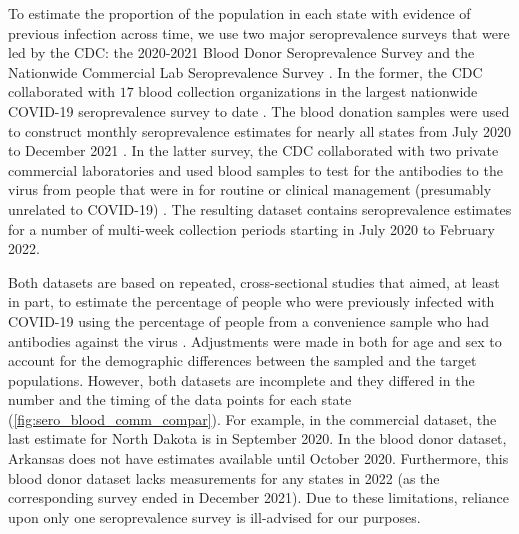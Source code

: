 \documentclass{article}
\begin{document}
To estimate the proportion of the population in each state with evidence of previous infection across time, we use two major seroprevalence surveys that were led by the CDC: the 2020-2021 Blood Donor Seroprevalence Survey and the Nationwide Commercial Lab Seroprevalence Survey \citep{cdc2021blood, cdc2021comm}. In the former, the CDC collaborated with $17$ blood collection organizations in the largest nationwide COVID-19 seroprevalence survey to date \citep{cdc2021blood}. The blood donation samples were used to construct monthly seroprevalence estimates for nearly all states from July 2020 to December 2021 \citep{jones2021estimated}. In the latter survey, the CDC collaborated with two private commercial laboratories and used blood samples to test for the antibodies to the virus from people that were in for routine or clinical management (presumably unrelated to COVID-19) \citep{bajema2021estimated}. The resulting dataset contains seroprevalence estimates for a number of multi-week collection periods starting in July 2020 to February 2022. 

Both datasets are based on repeated, cross-sectional studies that aimed, at least in part, to estimate the percentage of people who were previously infected with COVID-19 using the percentage of people from a convenience sample who had antibodies against the virus \citep{bajema2021estimated, cdc2020data, jones2021estimated}. Adjustments were made in both for age and sex to account for the demographic differences between the sampled and the target populations. However, both datasets are incomplete and they differed in the number and the timing of the data points for each state (\autoref{fig:sero_blood_comm_compar}). For example, in the commercial dataset, the last estimate for North Dakota is in September 2020. In the blood donor dataset, Arkansas does not have estimates available until October 2020. Furthermore, this blood donor dataset lacks measurements for any states in 2022 (as the corresponding survey ended in December 2021). Due to these limitations, reliance upon only one seroprevalence survey is ill-advised for our purposes. 
\end{document}
